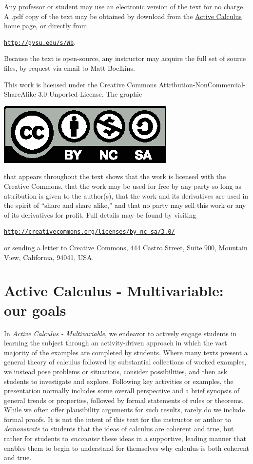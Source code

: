 Any professor or student may use an electronic version of the text for no charge.  A .pdf copy of the text may be obtained by download from the \href{http://faculty.gvsu.edu/boelkinm/Home/Active_Calculus.html}{Active Calculus home page}, or directly from
\begin{center} \href{http://gvsu.edu/s/Wb}{\texttt{http://gvsu.edu/s/Wb}}. \end{center}  
Because the text is open-source, any instructor may acquire the full set of source files, by request via email to Matt Boelkins.  

This work is licensed under the Creative Commons Attribution-NonCommercial-ShareAlike 3.0 Unported License.  The graphic 
\begin{center}
\includegraphics{figures/CClicense.eps}
\end{center}
that appears throughout the text shows that the work is licensed with the Creative Commons, that the work may be used for free by any party so long as attribution is given to the author(s), that the work and its derivatives are used in the spirit of ``share and share alike,'' and that no party may sell this work or any of its derivatives for profit.  Full details may be found by visiting
\begin{center}
\href{http://creativecommons.org/licenses/by-nc-sa/3.0/}{\texttt{http://creativecommons.org/licenses/by-nc-sa/3.0/}}
\end{center} 
or sending a letter to Creative Commons, 444 Castro Street, Suite 900, Mountain View, California, 94041, USA. 

\section*{Active Calculus - Multivariable: our goals}

In \emph{Active Calculus - Multivariable}, we endeavor to actively engage students in learning the subject through an activity-driven approach in which the vast majority of the examples are completed by students.  Where many texts present a general theory of calculus followed by substantial collections of worked examples, we instead pose problems or situations, consider possibilities, and then ask students to investigate and explore.  Following key activities or examples, the presentation normally includes some overall perspective and a brief synopsis of general trends or properties, followed by formal statements of rules or theorems.  While we often offer plausibility arguments for such results, rarely do we include formal proofs.  It is not the intent of this text for the instructor or author to \emph{demonstrate} to students that the ideas of calculus are coherent and true, but rather for students to \emph{encounter} these ideas in a supportive, leading manner that enables them to begin to understand for themselves why calculus is both coherent and true.  

